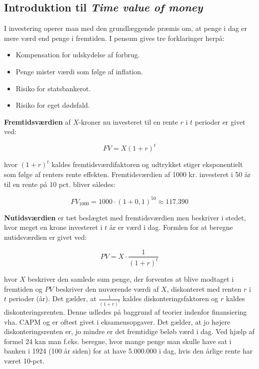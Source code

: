 \documentclass[10pt,reqno, usenames]{article}
\begin{document}
\subsection{Introduktion til \textit{Time value of money}}
I investering operer man med den grundlæggende præmis om, at penge i dag er mere værd end penge i fremtiden. I pensum gives tre forklaringer herpå: 
\begin{itemize}
    \item Kompensation for udskydelse af forbrug.
    \item Penge mister værdi som følge af inflation.
    \item Risiko for statsbankerot.
    \item Risiko for eget dødsfald.
\end{itemize}

\textbf{Fremtidsværdien} af $X$-kroner nu investeret til en rente $r$ i $t$ perioder er givet ved: 

\begin{equation}
    FV = X (1+r)^t
\end{equation}

hvor $(1+r)^t$ kaldes fremtidsværdifaktoren og udtrykket stiger eksponentielt som følge af renters rente effekten. Fremtidsværdien af 1000 kr. investeret i 50 år til en rente på 10 pct. bliver således: 

\begin{equation*}
    FV_{1000} = 1000 \cdot (1+0,1)^{50} \approx 117.390
\end{equation*}

\textbf{Nutidsværdien} er tæt beslægtet med fremtidsværdien men beskriver i stedet, hvor meget en krone investeret i $t$ år er værd i dag. Formlen for at beregne nutidsværdien er givet ved: 

\begin{equation}
    PV = X \cdot \frac{1}{(1+r)^t}
\end{equation}

hvor $X$ beskriver den samlede sum penge, der forventes at blive modtaget i fremtiden og $PV$ beskriver den nuværende værdi af $X$, diskonteret med renten $r$ i $t$ perioder (år). Det gælder, at $\frac{1}{(1+r)^t}$ kaldes diskonteringsfaktoren og $r$ kaldes diskonteringsrenten. Denne udledes på baggrund af teorier indenfor finansiering vha. CAPM og er oftest givet i eksamensopgaver. Det gælder, at jo højere diskonteringsrenten er, jo mindre er det fremtidige beløb værd i dag. Ved hjælp af formel 24 kan man f.eks. beregne, hvor mange penge man skulle have sat i banken i 1924 (100 år siden) for at have 5.000.000 i dag, hvis den årlige rente har været 10-pct. 
\end{document}
